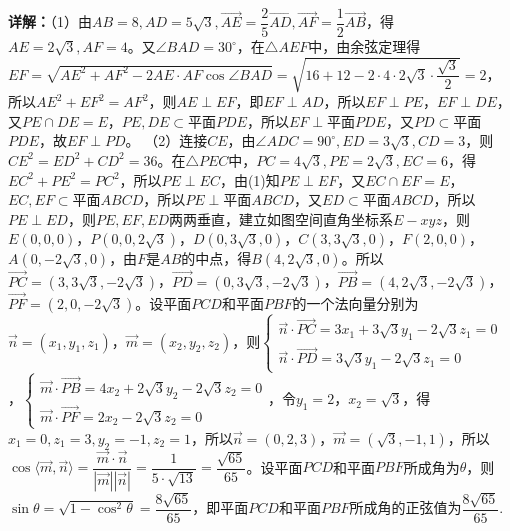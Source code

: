 \begin{question}[points=15]
\begin{solution}
\textbf{详解：}（1）由$AB=8,AD=5\sqrt{3},\overrightarrow{AE}=\dfrac{2}{5}\overrightarrow{AD},\overrightarrow{AF}=\dfrac{1}{2}\overrightarrow{AB}$，得$AE=2\sqrt{3},AF=4$。又$\angle BAD=30^\circ$，在$\triangle AEF$中，由余弦定理得$EF=\sqrt{AE^2+AF^2-2AE\cdot AF\cos\angle BAD}=\sqrt{16+12-2\cdot4\cdot2\sqrt{3}\cdot\dfrac{\sqrt{3}}{2}}=2$，所以$AE^2+EF^2=AF^2$，则$AE\perp EF$，即$EF\perp AD$，所以$EF\perp PE$，$EF\perp DE$，又$PE\cap DE=E$，$PE,DE\subset$平面$PDE$，所以$EF\perp$平面$PDE$，又$PD\subset$平面$PDE$，故$EF\perp PD$。
（2）连接$CE$，由$\angle ADC=90^\circ,ED=3\sqrt{3},CD=3$，则$CE^2=ED^2+CD^2=36$。在$\triangle PEC$中，$PC=4\sqrt{3},PE=2\sqrt{3},EC=6$，得$EC^2+PE^2=PC^2$，所以$PE\perp EC$，由(1)知$PE\perp EF$，又$EC\cap EF=E$，$EC,EF\subset$平面$ABCD$，所以$PE\perp$平面$ABCD$，又$ED\subset$平面$ABCD$，所以$PE\perp ED$，则$PE,EF,ED$两两垂直，建立如图空间直角坐标系$E-xyz$，则$E(0,0,0)$，$P(0,0,2\sqrt{3})$，$D(0,3\sqrt{3},0)$，$C(3,3\sqrt{3},0)$，$F(2,0,0)$，$A(0,-2\sqrt{3},0)$，由$F$是$AB$的中点，得$B(4,2\sqrt{3},0)$。所以$\overrightarrow{PC}=(3,3\sqrt{3},-2\sqrt{3})$，$\overrightarrow{PD}=(0,3\sqrt{3},-2\sqrt{3})$，$\overrightarrow{PB}=(4,2\sqrt{3},-2\sqrt{3})$，$\overrightarrow{PF}=(2,0,-2\sqrt{3})$。设平面$PCD$和平面$PBF$的一个法向量分别为$\vec{n}=(x_1,y_1,z_1)$，$\vec{m}=(x_2,y_2,z_2)$，则$\begin{cases}\vec{n}\cdot\overrightarrow{PC}=3x_1+3\sqrt{3}y_1-2\sqrt{3}z_1=0\\\vec{n}\cdot\overrightarrow{PD}=3\sqrt{3}y_1-2\sqrt{3}z_1=0\end{cases}$，$\begin{cases}\vec{m}\cdot\overrightarrow{PB}=4x_2+2\sqrt{3}y_2-2\sqrt{3}z_2=0\\\vec{m}\cdot\overrightarrow{PF}=2x_2-2\sqrt{3}z_2=0\end{cases}$，令$y_1=2$，$x_2=\sqrt{3}$，得$x_1=0,z_1=3,y_2=-1,z_2=1$，所以$\vec{n}=(0,2,3)$，$\vec{m}=(\sqrt{3},-1,1)$，所以$\cos\langle\vec{m},\vec{n}\rangle=\dfrac{\vec{m}\cdot\vec{n}}{|\vec{m}||\vec{n}|}=\dfrac{1}{5\cdot\sqrt{13}}=\dfrac{\sqrt{65}}{65}$。设平面$PCD$和平面$PBF$所成角为$\theta$，则$\sin\theta=\sqrt{1-\cos^2\theta}=\dfrac{8\sqrt{65}}{65}$，即平面$PCD$和平面$PBF$所成角的正弦值为$\dfrac{8\sqrt{65}}{65}$.
\end{solution}
\end{question}

